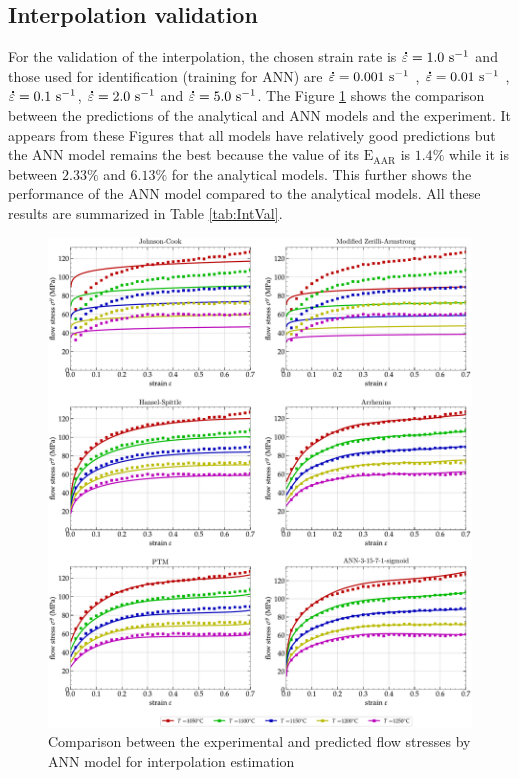\documentclass[twoside,english,1p,final,sort&compress]{elsarticle}
\theoremstyle{plain}
\DeclareRobustCommand{\mdot}[1]{\accentset{\mbox{\bfseries .}}{#1}}
\DeclareRobustCommand{\AARE}{\text{E}_\text{AAR}}
\DeclareRobustCommand{\ps}{\text{s}^{-1}}
\begin{document}
\subsection{Interpolation validation}
For the validation of the interpolation, the chosen strain rate is $\mdot\varepsilon = 1.0\ \ps$ and those used for identification (training for ANN) are $\mdot\varepsilon = 0.001\ \ps$ , $\mdot\varepsilon = 0.01\ \ps$ , $\mdot\varepsilon = 0.1\ \ps$, $\mdot\varepsilon = 2.0\ \ps$  and $\mdot\varepsilon = 5.0\ \ps$.
The Figure \ref{fig:IntComp} shows the comparison between the predictions of the analytical and ANN models and the experiment.
It appears from these Figures that all models have relatively good predictions but the ANN model remains the best because the value of its $\AARE$ is $1.4\%$ while it is between $2.33\%$ and $6.13\%$ for the analytical models.
This further shows the performance of the ANN model compared to the analytical models.
All these results are summarized in Table \ref{tab:IntVal}.
\begin{figure}[!ht]
\centering
\includegraphics[width=1.02\columnwidth]
{Figures/CompInt}
\caption{Comparison between the experimental and predicted flow stresses by ANN model for interpolation estimation}
\label{fig:IntComp}
\end{figure}
\end{document}

